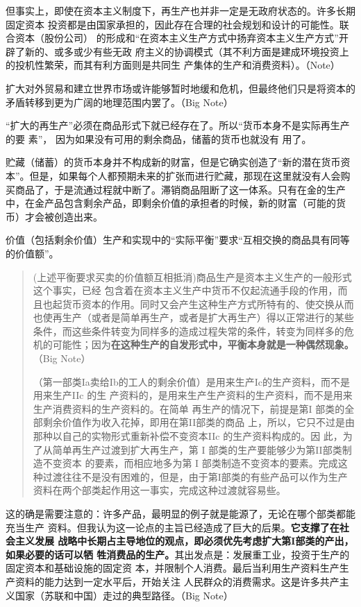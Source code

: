 但事实上，即使在资本主义制度下，再生产也并非一定是无政府状态的。许多长期固定资本
投资都是由国家承担的，因此存在合理的社会规划和设计的可能性。联合资本（股份公司）
的形成和“在资本主义生产方式中扬弃资本主义生产方式”开辟了新的、或多或少有些无政
府主义的协调模式（其不利方面是建成环境投资上的投机性繁荣，而其有利方面则是共同生
产集体的生产和消费资料）。（Note）

扩大对外贸易和建立世界市场或许能够暂时地缓和危机，但最终他们只是将资本的矛盾转移到更为广阔的地理范围内罢了。（Big Note）

“扩大的再生产”必须在商品形式下就已经存在了。所以“货币本身不是实际再生产的要
素”， 因为如果没有可用的剩余商品，储蓄的货币也就没有
用了。

贮藏（储蓄）的货币本身并不构成新的财富，但是它确实创造了“新的潜在货币资本”。但是，如果每个人都预期未来的扩张而进行贮藏，那现在这里就没有人会购买商品了，于是流通过程就中断了。滞销商品阻断了这一体系。只有在金的生产中，在金产品包含剩余产品，即剩余价值的承担者的时候，新的财富（可能的货币）才会被创造出来。

价值（包括剩余价值）生产和实现中的“实际平衡”要求“互相交换的商品具有同等的价值额”。

\begin{quotation}
(上述平衡要求买卖的价值额互相抵消)商品生产是资本主义生产的一般形式这个事实，已经
包含着在资本主义生产中货币不仅起流通手段的作用，而且也起货币资本的作用。同时又会产生这种生产方式所特有的、使交换从而也使再生产（或者是简单再生产，或者是扩大再生产）得以正常进行的某些条件，而这些条件转变为同样多的造成过程失常的条件，转变为同样多的危机的可能性；因为\textbf{在这种生产的自发形式中，平衡本身就是一种偶然现象。} （Big Note）

（第一部类Ia卖给Ib的工人的剩余价值）是用来生产Ic的生产资料，而不是用来生产IIc 的生
产资料的，是用来生产生产资料的生产资料，而不是用来生产消费资料的生产资料的。在简单
再生产的情况下，前提是第I 部类的全部剩余价值作为收入花掉，即用在第II部类的商品
上，所以，它只不过是由那种以自己的实物形式重新补偿不变资本IIc 的生产资料构成的。因
此，为了从简单再生产过渡到扩大再生产，第 I 部类的生产要能够少为第II部类制造不变资本
的要素，而相应地多为第 I 部类制造不变资本的要素。完成这种过渡往往不是没有困难的，但是，由于第I部类的有些产品可以作为生产资料在两个部类起作用这一事实，完成这种过渡就容易些。 

\end{quotation}

这的确是需要注意的：许多产品，最明显的例子就是能源了，无论在哪个部类都能充当生产
资料。但我认为这一论点的主旨已经造成了巨大的后果。\textbf{它支撑了在社会主义发展
  战略中长期占主导地位的观点，即必须优先考虑扩大第I部类的产出，如果必要的话可以牺
  牲消费品的生产。}其出发点是：发展重工业，投资于生产的固定资本和基础设施的固定资
本，并限制个人消费。最后当利用生产资料生产生产资料的能力达到一定水平后，开始关注
人民群众的消费需求。这是许多共产主义国家（苏联和中国）走过的典型路径。（Big Note）


